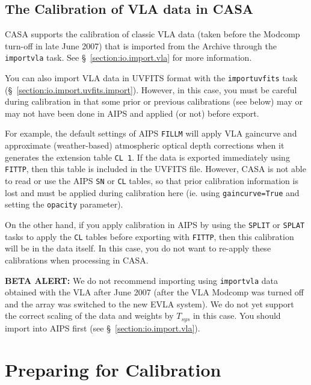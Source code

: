 \subsection{The Calibration of VLA data in CASA}
\label{section:cal.flow.vla}

CASA supports the calibration of classic VLA data (taken
before the Modcomp turn-off in late June 2007) that is 
imported from the Archive through the {\tt importvla} task.
See \S~\ref{section:io.import.vla} for more information.

You can also import VLA data in UVFITS format with the 
{\tt importuvfits} task (\S~\ref{section:io.import.uvfits.import}).
However, in this case, you must be careful during calibration in
that some prior or previous calibrations (see below) may or may not
have been done in AIPS and applied (or not) before export.

For example, the default settings of AIPS {\tt FILLM} will apply
VLA gaincurve and approximate (weather-based) atmospheric optical
depth corrections when it generates the extension table {\tt CL 1}.
If the data is exported immediately using {\tt FITTP}, then this 
table is included in the UVFITS file.  However, CASA is not able
to read or use the AIPS {\tt SN} or {\tt CL} tables, so that 
prior calibration information is lost and must be applied during
calibration here (ie. using {\tt gaincurve=True} and setting the
{\tt opacity} parameter).  

On the other hand, if you apply calibration in AIPS by using the
{\tt SPLIT} or {\tt SPLAT} tasks to apply the {\tt CL} tables before
exporting with {\tt FITTP}, then this calibration will be in the
data itself.  In this case, you do not want to re-apply these
calibrations when processing in CASA.

{\bf BETA ALERT:} We do not recommend importing using 
{\tt importvla} data obtained with the VLA after June 2007 (after the
VLA Modcomp was turned off and the array was switched to the new EVLA
system). We do not yet support the correct scaling of
the data and weights by $T_{sys}$ in this case.  You should import
into AIPS first (see \S~\ref{section:io.import.vla}).

\section{Preparing for Calibration}
\label{section:cal.prior}


